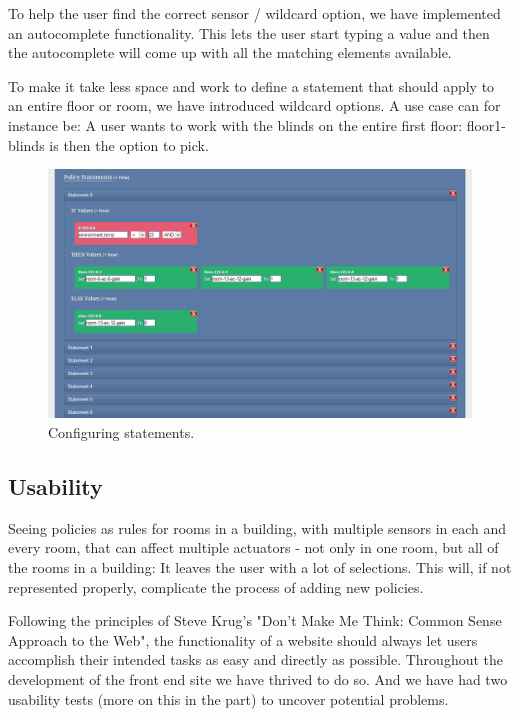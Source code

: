 To help the user find the correct sensor / wildcard option, we have implemented an autocomplete functionality. This lets the user start typing a value and then the autocomplete will come up with all the matching elements available.

To make it take less space and work to define a statement that should apply to an entire floor or room, we have introduced wildcard options. A use case can for instance be: A user wants to work with the blinds on the entire first floor: floor1-blinds is then the option to pick.

\begin{figure}[ht]
\centering
\includegraphics[width=\columnwidth]{statement.png}
\caption{Configuring statements.}
\label{fig:statement}
\end{figure}

\subsection{Usability}
Seeing policies as rules for rooms in a building, with multiple sensors in each and every room, that can affect multiple actuators - not only in one room, but all of the rooms in a building: It leaves the user with a lot of selections. 
This will, if not represented properly, complicate the process of adding new policies.

Following the principles of Steve Krug's "Don't Make Me Think: Common Sense Approach to the Web"\cite{Krug:2005:DMM:1051204}, the functionality of a website should always let users accomplish their intended tasks as easy and directly as possible.
Throughout the development of the front end site we have thrived to do so. And we have had two usability tests (more on this in the  part) to uncover potential problems.

